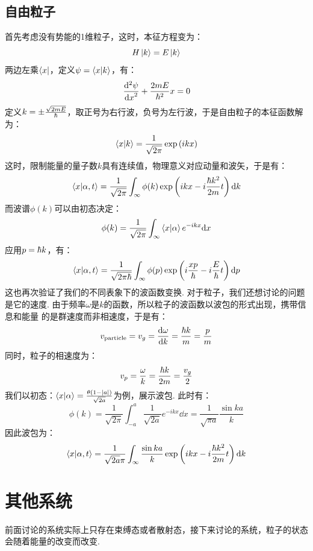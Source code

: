 \subsection{自由粒子}
首先考虑没有势能的1维粒子，这时，本征方程变为：
\[
H\ket{k} = E\ket{k}
\]
两边左乘\(\bra{x}\)，定义\(\psi = \bra{x}\ket{k}\)，有：
\[
\frac{\dd^2{\psi}}{\dd{x}^2} + \frac{2mE}{\hbar^{2}}x = 0
\]
定义\(k = \pm\frac{\sqrt{2mE}}{\hbar}\)，取正号为右行波，负号为左行波，于是自由粒子的本征函数解为：
\[
\bra{x}\ket{k} = \frac{1}{\sqrt{2\pi}}\exp\left({ikx}\right)
\]
这时，限制能量的量子数\(k\)具有连续值，物理意义对应动量和波矢，于是有：
\[
\bra{x}\ket{\alpha,t} = \frac{1}{\sqrt{2\pi}}\int_{\infty}\phi(k)\exp\left({ikx-i\frac{\hbar k^2}{2m}t}\right)\dd k
\]
而波谱\(\phi(k)\)可以由初态决定：
\[
\phi(k) = \frac{1}{\sqrt{2\pi}}\int_{\infty}\bra{x}\ket{\alpha}e^{-ikx}\dd x
\]
应用\(p = \hbar k\)，有：
\[
\bra{x}\ket{\alpha,t} = \frac{1}{\sqrt{2\pi\hbar}}\int_{\infty}\phi(p)\exp\left({i\frac{xp}{\hbar}-i\frac{E}{\hbar}t}\right)\dd p
\]
这也再次验证了我们的不同表象下的波函数变换. 对于粒子，我们还想讨论的问题是它的速度. 由于频率\(\omega\)是\(k\)的函数，所以粒子的波函数以波包的形式出现，携带信息和能量
的是群速度而非相速度，于是有：
\[
v_{\mathrm{particle}} = v_{g} = \frac{\dd{\omega}}{\dd{k}} = \frac{\hbar k}{m} = \frac{p}{m}
\]
同时，粒子的相速度为：
\[
v_{p} = \frac{\omega}{k} = \frac{\hbar k}{2m} = \frac{v_{g}}{2}
\]
我们以初态：\(\bra{x}\ket{\alpha} = \frac{\theta(1-|a|)}{\sqrt{2a}}\)为例，展示波包. 此时有：
\[
\phi(k) = \frac{1}{\sqrt{2\pi}}\int_{-a}^{a}\frac{1}{\sqrt{2a}}e^{-ikx}\dd x = \frac{1}{\sqrt{\pi a}}\frac{\sin ka}{k}
\]
因此波包为：
\[
\bra{x}\ket{\alpha,t} = \frac{1}{\sqrt{2a}\pi}\int_{\infty}\frac{\sin ka}{k}\exp\left({ikx-i\frac{\hbar k^2}{2m}t}\right)\dd{k}
\]
\section{其他系统}
前面讨论的系统实际上只存在束缚态或者散射态，接下来讨论的系统，粒子的状态会随着能量的改变而改变. 
